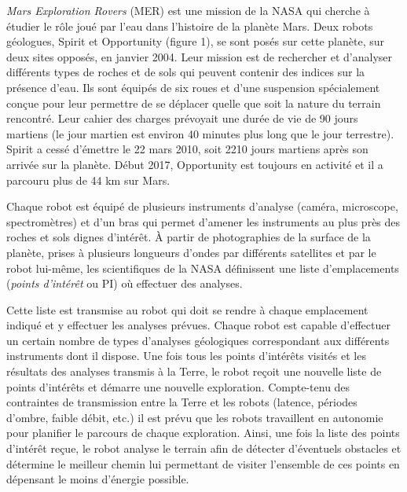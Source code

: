 \textit{Mars Exploration Rovers} (MER) est une mission de la NASA qui cherche à étudier le rôle joué par l’eau dans
l’histoire de la planète Mars. Deux robots géologues, Spirit et Opportunity (figure 1), se sont posés sur cette
planète, sur deux sites opposés, en janvier 2004. Leur mission est de rechercher et d’analyser différents types de
roches et de sols qui peuvent contenir des indices sur la présence d’eau. 
Ils sont équipés de six roues et d’une
suspension spécialement conçue pour leur permettre de se déplacer quelle que soit la nature du terrain rencontré.
Leur cahier des charges prévoyait une durée de vie de 90 jours martiens (le jour martien est environ 40 minutes
plus long que le jour terrestre). Spirit a cessé d’émettre le 22 mars 2010, soit 2210 jours martiens après son
arrivée sur la planète. Début 2017, Opportunity est toujours en activité et il a parcouru plus de 44 km sur Mars.


Chaque robot est équipé de plusieurs instruments d’analyse (caméra, microscope, spectromètres) et d’un bras
qui permet d’amener les instruments au plus près des roches et sols dignes d’intérêt. À partir de photographies de
la surface de la planète, prises à plusieurs longueurs d’ondes par différents satellites et par le robot lui-même, les
scientifiques de la NASA définissent une liste d’emplacements (\textit{points d’intérêt} ou PI) où effectuer des analyses.

Cette liste est transmise au robot qui doit se rendre à chaque emplacement indiqué et y effectuer les analyses
prévues. Chaque robot est capable d’effectuer un certain nombre de types d’analyses géologiques correspondant
aux différents instruments dont il dispose. Une fois tous les points d’intérêts visités et les résultats des analyses
transmis à la Terre, le robot reçoit une nouvelle liste de points d’intérêts et démarre une nouvelle exploration.
Compte-tenu des contraintes de transmission entre la Terre et les robots (latence, périodes d’ombre, faible débit,
etc.) il est prévu que les robots travaillent en autonomie pour planifier le parcours de chaque exploration. Ainsi,
une fois la liste des points d’intérêt reçue, le robot analyse le terrain afin de détecter d’éventuels obstacles et
détermine le meilleur chemin lui permettant de visiter l’ensemble de ces points en dépensant le moins d’énergie
possible.

